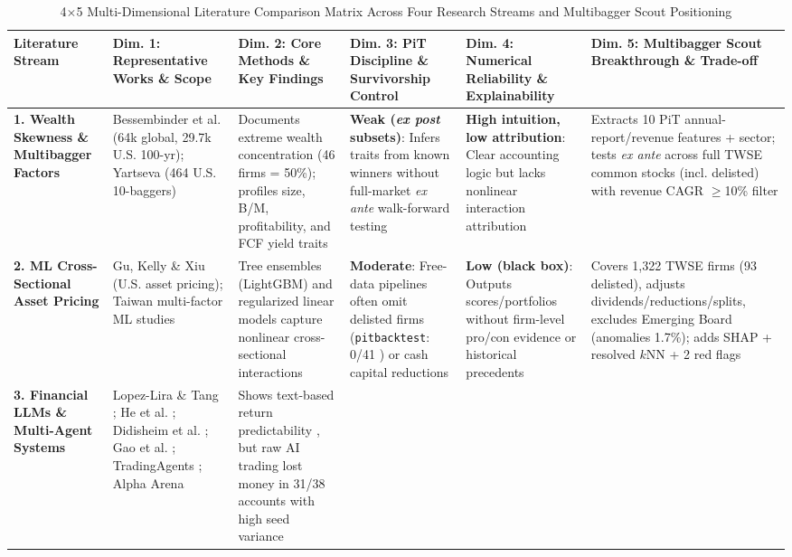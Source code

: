 \documentclass[conference]{IEEEtran}
\begin{document}
\begin{table}[t]
\centering
\caption{4$\times$5 Multi-Dimensional Literature Comparison Matrix Across Four Research Streams and Multibagger Scout Positioning}
\label{tab:related_work}
\renewcommand{\arraystretch}{1.15}
\scriptsize
\begin{tabularx}{\textwidth}{L{2.35cm} L{2.45cm} L{3.0cm} L{2.85cm} L{2.75cm} Y}
\toprule
\textbf{Literature Stream} & \textbf{Dim. 1: Representative Works \& Scope} & \textbf{Dim. 2: Core Methods \& Key Findings} & \textbf{Dim. 3: PiT Discipline \& Survivorship Control} & \textbf{Dim. 4: Numerical Reliability \& Explainability} & \textbf{Dim. 5: Multibagger Scout Breakthrough \& Trade-off} \\
\midrule
\textbf{1. Wealth Skewness \& Multibagger Factors} &
Bessembinder et al. \cite{bessembinder2023, bessembinder2026} (64k global, 29.7k U.S. 100-yr); Yartseva \cite{yartseva2025} (464 U.S. 10-baggers) &
Documents extreme wealth concentration (46 firms = 50\%); profiles size, B/M, profitability, and FCF yield traits &
\textbf{Weak (\emph{ex post} subsets)}: Infers traits from known winners without full-market \emph{ex ante} walk-forward testing &
\textbf{High intuition, low attribution}: Clear accounting logic but lacks nonlinear interaction attribution &
Extracts 10 PiT annual-report/revenue features + sector; tests \emph{ex ante} across full TWSE common stocks (incl. delisted) with revenue CAGR $\ge$10\% filter \\
\midrule
\textbf{2. ML Cross-Sectional Asset Pricing} &
Gu, Kelly \& Xiu \cite{gu2020} (U.S. asset pricing); Taiwan multi-factor ML studies &
Tree ensembles (LightGBM) and regularized linear models capture nonlinear cross-sectional interactions &
\textbf{Moderate}: Free-data pipelines often omit delisted firms (\texttt{pitbacktest}: 0/41 \cite{gao2026}) or cash capital reductions &
\textbf{Low (black box)}: Outputs scores/portfolios without firm-level pro/con evidence or historical precedents &
Covers 1,322 TWSE firms (93 delisted), adjusts dividends/reductions/splits, excludes Emerging Board (anomalies 1.7\%); adds SHAP + resolved $k$NN + 2 red flags \\
\midrule
\textbf{3. Financial LLMs \& Multi-Agent Systems} &
Lopez-Lira \& Tang \cite{lopezlira2026}; He et al. \cite{he2025chrono}; Didisheim et al. \cite{didisheim2025}; Gao et al. \cite{gao2026}; TradingAgents \cite{xiao2025tradingagents}; Alpha Arena \cite{alphaarena2026} &
Shows text-based return predictability \cite{lopezlira2026}, but raw AI trading lost money in 31/38 accounts \cite{alphaarena2026} with high seed variance \cite{xiao2025tradingagents} &

\end{tabularx}
\end{table}
\end{document}
